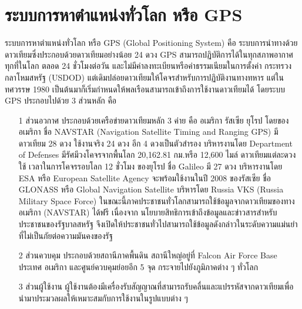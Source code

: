\section{ระบบการหาตำแหน่งทั่วโลก หรือ GPS}
\quad ระบบการหาตำแหน่งทั่วโลก หรือ GPS (Global Positioning System) คือ ระบบการนำทางด้วยดาวเทียมซึ่งประกอบด้วยดาวเทียมอย่างน้อย 24 ดวง GPS สามารถปฏิบัติการได้ในทุกสภาพอากาศ ทุกที่ในโลก ตลอด 24 ชั่วโมงต่อวัน และไม่มีค่าลงทะเบียนหรือค่าธรรมเนียมในการตั้งค่า กระทรวงกลาโหมสหรัฐ (USDOD) แต่เดิมปล่อยดาวเทียมให้โคจรสำหรับการปฏิบัติงานทางทหาร แต่ในทศวรรษ 1980 เป็นต้นมาก็เริ่มกำหนดให้พลเรือนสามารถเข้าถึงการใช้งานดาวเทียมได้ โดยระบบ GPS ประกอบไปด้วย 3 ส่วนหลัก คือ  
\begin{itemize}
  \item[1] ส่วนอวกาศ ประกอบด้วยเครือข่ายดาวเทียมหลัก 3 ค่าย คือ อเมริกา รัสเซีย ยุโรป โดยของอเมริกา ชื่อ NAVSTAR (Navigation Satellite Timing and Ranging GPS) มีดาวเทียม 28 ดวง ใช้งานจริง 24 ดวง อีก 4 ดวงเป็นตัวสำรอง บริหารงานโดย Department of Defenses มีรัศมีวงโคจรจากพื้นโลก 20,162.81 กม.หรือ 12,600 ไมล์ ดาวเทียมแต่ละดวงใช้ เวลาในการโคจรรอบโลก 12 ชั่วโมง ของยุโรป ชื่อ Galileo มี 27 ดวง บริหารงานโดย ESA หรือ European Satellite Agency จะพร้อมใช้งานในปี 2008 ของรัสเซีย ชื่อ GLONASS หรือ Global Navigation Satellite บริหารโดย Russia VKS (Russia Military Space Force) ในขณะนี้ภาคประชาชนทั่วโลกสามารถใช้ข้อมูลจากดาวเทียมของทางอเมริกา (NAVSTAR) ได้ฟรี เนื่องจาก นโยบายสิทธิการเข้าถึงข้อมูลและข่าวสารสำหรับประชาชนของรัฐบาลสหรัฐ จึงเปิดให้ประชาชนทั่วไปสามารถใช้ข้อมูลดังกล่าวในระดับความแม่นยำที่ไม่เป็นภัยต่อความมันคงของรัฐ  
  \item[2] ส่วนควบคุม ประกอบด้วยสถานีภาคพื้นดิน สถานีใหญ่อยู่ที่ Falcon Air Force Base ประเทศ อเมริกา และศูนย์ควบคุมย่อยอีก 5 จุด กระจายไปยังภูมิภาคต่าง ๆ ทั่วโลก
  \item[3] ส่วนผู้ใช้งาน ผู้ใช้งานต้องมีเครื่องรับสัญญาณที่สามารถรับคลื่นและแปรรหัสจากดาวเทียมเพื่อนำมาประมวลผลให้เหมาะสมกับการใช้งานในรูปแบบต่าง ๆ 
\end{itemize}

